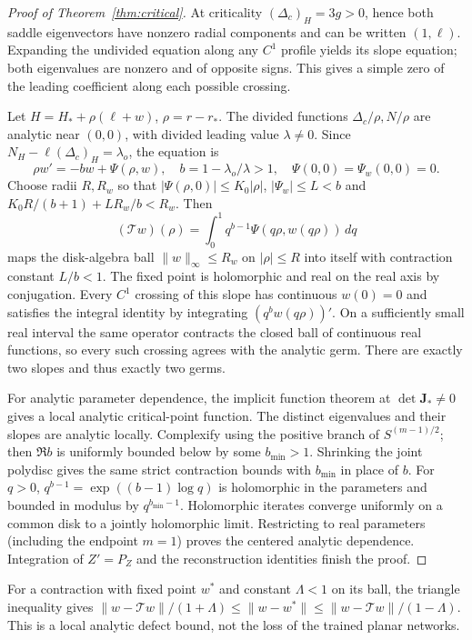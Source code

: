 \documentclass[12pt,a4paper,oneside]{report}
\numberwithin{equation}{chapter}
\theoremstyle{definition}
\theoremstyle{remark}\newtheorem{remark}[theorem]{Remark}
\newif\ifreviewmarks
\DeclareRobustCommand{\review}[1]{{\ifreviewmarks\color{authorblue}\fi #1}}
\begin{document}
\begin{proof}[Proof of Theorem~\ref{thm:critical}]
At criticality $(\Delta_c)_H=3g>0$, hence both saddle eigenvectors have nonzero radial components and can be written $(1,\ell)$. Expanding the undivided equation along any $C^1$ profile yields its slope equation; both eigenvalues are nonzero and of opposite signs. This gives a simple zero of the leading coefficient along each possible crossing.

Let $H=H_*+\rho(\ell+w)$, $\rho=r-r_*$. The divided functions $\Delta_c/\rho,N/\rho$ are analytic near $(0,0)$, with divided leading value $\lambda\ne0$. Since $N_H-\ell(\Delta_c)_H=\lambda_o$, the equation is
\[
 \rho w'=-bw+\Psi(\rho,w),\quad b=1-\lambda_o/\lambda>1,
 \quad\Psi(0,0)=\Psi_w(0,0)=0.
\]
Choose radii $R,R_w$ so that $|\Psi(\rho,0)|\le K_0|\rho|$, $|\Psi_w|\le L<b$ and $K_0R/(b+1)+LR_w/b<R_w$. Then
\[
 (\mathcal T w)(\rho)=\int_0^1q^{b-1}\Psi(q\rho,w(q\rho))\,dq
\]
maps the disk-algebra ball $\|w\|_\infty\le R_w$ on $|\rho|\le R$ into itself with contraction constant $L/b<1$. The fixed point is holomorphic and real on the real axis by conjugation. Every $C^1$ crossing of this slope has continuous $w(0)=0$ and satisfies the integral identity by integrating $(q^bw(q\rho))'$. On a sufficiently small real interval the same operator contracts the closed ball of continuous real functions, so every such crossing agrees with the analytic germ. There are exactly two slopes and thus exactly two germs.

For analytic parameter dependence, the implicit function theorem at $\det\mathbf J_*\ne0$ gives a local analytic critical-point function. The distinct eigenvalues and their slopes are analytic locally. Complexify using the positive branch of $S^{(m-1)/2}$; then $\Re b$ is uniformly bounded below by some $b_{\min}>1$. Shrinking the joint polydisc gives the same strict contraction bounds with $b_{\min}$ in place of $b$. For $q>0$, $q^{b-1}=\exp((b-1)\log q)$ is holomorphic in the parameters and bounded in modulus by $q^{b_{\min}-1}$. Holomorphic iterates converge uniformly on a common disk to a jointly holomorphic limit. Restricting to real parameters (including the endpoint $m=1$) proves the centered analytic dependence. Integration of $Z'=P_Z$ and the reconstruction identities finish the proof.
\end{proof}
\review{For a contraction with fixed point $w^*$ and constant $\Lambda<1$ on its ball, the triangle inequality gives $\|w-\mathcal Tw\|/(1+\Lambda)\le\|w-w^*\|\le\|w-\mathcal Tw\|/(1-\Lambda)$. This is a local analytic defect bound, not the loss of the trained planar networks.}
\end{document}
